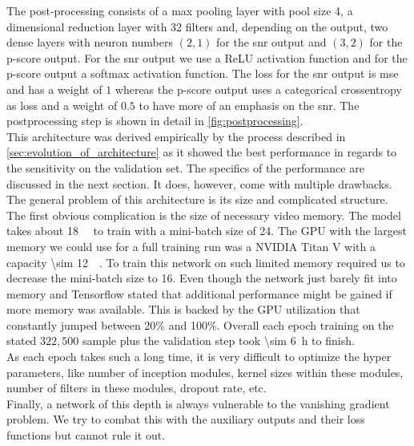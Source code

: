 The post-processing consists of a max pooling layer with pool size 4, a dimensional reduction layer with 32 filters and, depending on the output, two dense layers with neuron numbers $(2,1)$ for the \gls{snr} output and $(3,2)$ for the p-score output. For the \gls{snr} output we use a ReLU activation function and for the p-score output a softmax activation function. The loss for the \gls{snr} output is \gls{mse} and has a weight of $1$ whereas the p-score output uses a categorical crossentropy as loss and a weight of $0.5$ to have more of an emphasis on the \gls{snr}. The postprocessing step is shown in detail in \autoref{fig:postprocessing}.\medskip\\
This architecture was derived empirically by the process described in \autoref{sec:evolution_of_architecture} as it showed the best performance in regards to the sensitivity on the validation set. The specifics of the performance are discussed in the next section. It does, however, come with multiple drawbacks. The general problem of this architecture is its size and complicated structure. The first obvious complication is the size of necessary video memory. The model takes about \SI{18}{\giga\byte} to train with a mini-batch size of 24. The GPU with the largest memory we could use for a full training run was a NVIDIA Titan V with a capacity \SI{\sim 12}{\giga\byte}. To train this network on such limited memory required us to decrease the mini-batch size to 16. Even though the network just barely fit into memory and Tensorflow stated that additional performance might be gained if more memory was available. This is backed by the GPU utilization that constantly jumped between 20\% and 100\%. Overall each epoch training on the stated $322,500$ sample plus the validation step took \SI{\sim 6}{\hour} to finish.\\
As each epoch takes such a long time, it is very difficult to optimize the hyper parameters, like number of inception modules, kernel sizes within these modules, number of filters in these modules, dropout rate, etc.\\
Finally, a network of this depth is always vulnerable to the vanishing gradient problem. We try to combat this with the auxiliary outputs and their loss functions but cannot rule it out.

